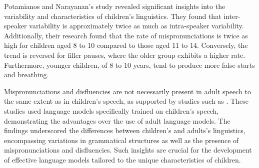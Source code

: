 Potamianos and Narayanan's study \cite{language_children2} revealed significant insights into the variability and characteristics of children's linguistics. They found that inter-speaker variability is approximately twice as much as intra-speaker variability. Additionally, their research found that the rate of mispronunciations is twice as high for children aged 8 to 10 compared to those aged 11 to 14. Conversely, the trend is reversed for filler pauses, where the older group exhibits a higher rate. Furthermore, younger children, of 8 to 10 years, tend to produce more false starts and breathing.


Mispronunciations and disfluencies are not necessarily present in adult speech to the same extent as in children's speech, as supported by studies such as \cite{Children_language_model,children_language_model2}. These studies used language models specifically trained on children's speech, demonstrating the advantages over the use of adult language models. The findings underscored the differences between children's and adults's linguistics, encompassing variations in grammatical structures as well as the presence of mispronunciations and disfluencies. Such insights are crucial for the development of effective language models tailored to the unique characteristics of children.


